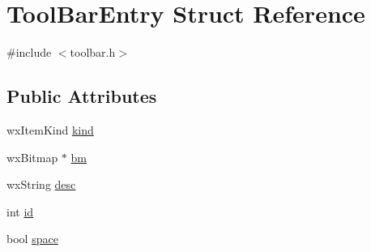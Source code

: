 \hypertarget{a00145}{\section{Tool\-Bar\-Entry Struct Reference}
\label{a00145}
}


{\ttfamily \#include $<$toolbar.\-h$>$}

\subsection*{Public Attributes}
\begin{DoxyCompactItemize}
\item 
wx\-Item\-Kind \hyperlink{a00145_af1d846c95e737ada6a08a4de768ac501}{kind}
\item 
wx\-Bitmap $\ast$ \hyperlink{a00145_a69d59b9f985f419ed56dce7ee0618792}{bm}
\item 
wx\-String \hyperlink{a00145_a16c9a95a9260b436c6dd2781fe58ef33}{desc}
\item 
int \hyperlink{a00145_aaccd6c831007969663f3ab345a9dd0e2}{id}
\item 
bool \hyperlink{a00145_ad69c99792a9810112cbee30adbee7a6e}{space}
\end{DoxyCompactItemize}


